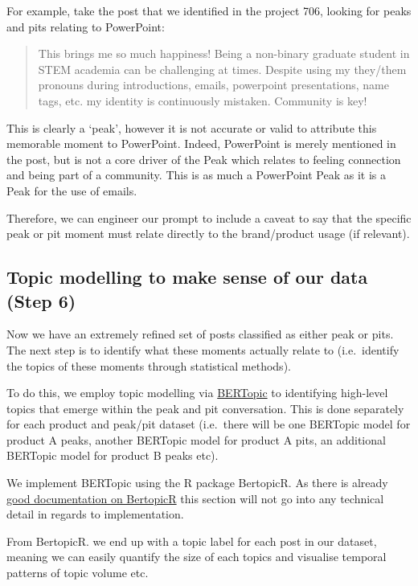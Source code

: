 \documentclass[
  letterpaper,
  DIV=11,
  numbers=noendperiod]{scrreprt}
\begin{document}
For example, take the post that we identified in the project 706,
looking for peaks and pits relating to PowerPoint:

\begin{quote}
This brings me so much happiness! Being a non-binary graduate student in
STEM academia can be challenging at times. Despite using my they/them
pronouns during introductions, emails, powerpoint presentations, name
tags, etc. my identity is continuously mistaken. Community is key!
\end{quote}

This is clearly a `peak', however it is not accurate or valid to
attribute this memorable moment to PowerPoint. Indeed, PowerPoint is
merely mentioned in the post, but is not a core driver of the Peak which
relates to feeling connection and being part of a community. This is as
much a PowerPoint Peak as it is a Peak for the use of emails.

Therefore, we can engineer our prompt to include a caveat to say that
the specific peak or pit moment must relate directly to the
brand/product usage (if relevant).

\subsection{Topic modelling to make sense of our data (Step
6)}\label{step-six}

Now we have an extremely refined set of posts classified as either peak
or pits. The next step is to identify what these moments actually relate
to (i.e.~identify the topics of these moments through statistical
methods).

To do this, we employ topic modelling via
\href{https://maartengr.github.io/BERTopic/index.html}{BERTopic} to
identifying high-level topics that emerge within the peak and pit
conversation. This is done separately for each product and peak/pit
dataset (i.e.~there will be one BERTopic model for product A peaks,
another BERTopic model for product A pits, an additional BERTopic model
for product B peaks etc).

We implement BERTopic using the R package BertopicR. As there is already
\href{https://aoiferyan-sc.github.io/BertopicR/}{good documentation on
BertopicR} this section will not go into any technical detail in regards
to implementation.

From BertopicR. we end up with a topic label for each post in our
dataset, meaning we can easily quantify the size of each topics and
visualise temporal patterns of topic volume etc.
\end{document}
